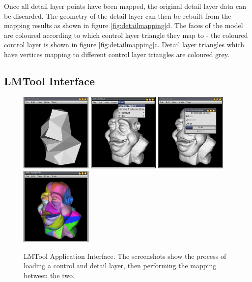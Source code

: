 Once all detail layer points have been mapped, the original detail layer data can be discarded. The geometry of the detail layer can then be rebuilt from the mapping results as shown in figure \ref{fig:detailmapping}d. The faces of the model are coloured according to which control layer triangle they map to - the coloured control layer is shown in figure \ref{fig:detailmapping}c. Detail layer triangles which have vertices mapping to different control layer triangles are coloured grey.

\subsection{\label{sec:scandata:creation:lmtool}LMTool Interface}

\begin{figure}
\begin{center}
\includegraphics[width=3.5cm]{../images/lmtool_control}
\includegraphics[width=3.5cm]{../images/lmtool_detail}
\includegraphics[width=3.5cm]{../images/lmtool_mapdialog}
\includegraphics[width=3.5cm]{../images/lmtool_mapping}
\caption[LMTool Application Interface.]{\label{fig:lmtool} LMTool Application Interface. The screenshots show the process of loading a control and detail layer, then performing the mapping between the two.}
\end{center}
\end{figure}

